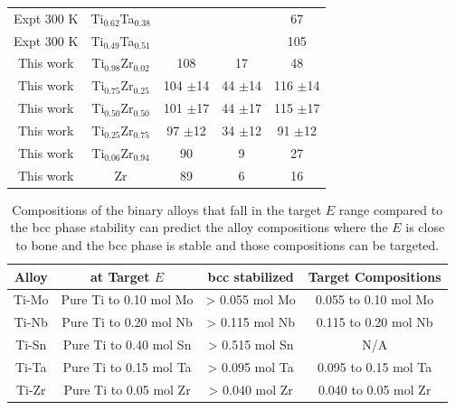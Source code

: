 \begin{longtable}[H]{ c c c c c}
	Expt 300 K \cite{Zhou2004a} & Ti$_{0.62}$Ta$_{0.38}$ & & & 67\\
	Expt 300 K \cite{Zhou2004a} & Ti$_{0.49}$Ta$_{0.51}$ & & & 105\\
	This work & Ti$_{0.98}$Zr$_{0.02}$ & 108 & 17 & 48\\
	This work & Ti$_{0.75}$Zr$_{0.25}$ & 104 $\pm$14 & 44 $\pm$14 & 116 $\pm$14\\
	This work & Ti$_{0.50}$Zr$_{0.50}$ & 101 $\pm$17 & 44 $\pm$17 & 115 $\pm$17\\
	This work & Ti$_{0.25}$Zr$_{0.75}$ & 97 $\pm$12 & 34 $\pm$12 & 91 $\pm$12\\
	This work & Ti$_{0.06}$Zr$_{0.94}$ & 90 & 9 & 27\\
	This work & Zr & 89 & 6 & 16\\
\end{longtable}

\newpage
\begin{table}[H]
	\caption{Compositions of the binary alloys that fall in the target $E$ range compared to the bcc phase stability can predict the alloy compositions where the $E$ is close to bone and the bcc phase is stable and those compositions can be targeted.}
	\centering
	\begin{tabular}{ c c c c }
		\hline
		Alloy & at Target $E$ & bcc stabilized & Target Compositions\\
		\hline
		Ti-Mo & Pure Ti to 0.10 mol Mo & > 0.055 mol Mo & 0.055 to 0.10 mol Mo\\
		Ti-Nb & Pure Ti to 0.20 mol Nb & > 0.115 mol Nb & 0.115 to 0.20 mol Nb\\		
		Ti-Sn & Pure Ti to 0.40 mol Sn & > 0.515 mol Sn & N/A\\		
		Ti-Ta & Pure Ti to 0.15 mol Ta & > 0.095 mol Ta & 0.095 to 0.15 mol Ta\\
		Ti-Zr & Pure Ti to 0.05 mol Zr & > 0.040 mol Zr & 0.040 to 0.05 mol Zr\\		
		\hline
	\end{tabular}
	\label{Ch5-table:targetalloys}
\end{table}
\clearpage

